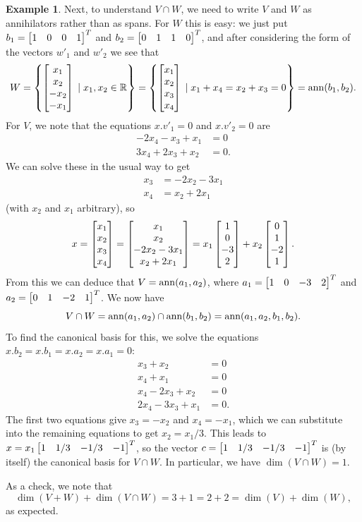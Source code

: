 \documentclass[reqno]{amsart}
\theoremstyle{definition}
\newtheorem{example}[theorem]{Example}
\begin{document}
\begin{example}
 Next, to understand $V\cap W$, we need to write $V$ and $W$ as
 annihilators rather than as spans.  For $W$ this is easy: we just put
 $b_1=\left[\begin{matrix} 1&0&0&1\end{matrix}\right]^T$ and $b_2=\left[\begin{matrix} 0&1&1&0\end{matrix}\right]^T$, and after
 considering the form of the vectors $w'_1$ and $w'_2$ we see that
 \[ W
    = \left\{\left[\begin{matrix} x_1 \\ x_2 \\ -x_2 \\ -x_1\end{matrix}\right] \;|\; x_1,x_2 \in{\mathbb{R}} \right\}
    = \left\{\left[\begin{matrix} x_1 \\ x_2 \\  x_3 \\  x_4\end{matrix}\right] \;|\; x_1+x_4=x_2+x_3=0 \right\}
    = \operatorname{ann}(b_1,b_2).
 \]
 For $V$, we note that the equations $x.v'_1=0$ and $x.v'_2=0$ are
 \begin{align*}
  -2x_4-x_3+x_1 &= 0 \\
  3x_4+2x_3+x_2 &= 0.
 \end{align*}
 We can solve these in the usual way to get
 \begin{align*}
  x_3 &= -2x_2-3x_1 \\
  x_4 &= x_2+2x_1
 \end{align*}
 (with $x_2$ and $x_1$ arbitrary), so
 \[ x
    = \left[\begin{matrix} x_1 \\ x_2 \\ x_3 \\ x_4 \end{matrix}\right]
    = \left[\begin{matrix} x_1 \\ x_2 \\ -2x_2-3x_1 \\ x_2+2x_1 \end{matrix}\right]
    = x_1 \left[\begin{matrix} 1 \\ 0 \\ -3 \\ 2 \end{matrix}\right] +
      x_2 \left[\begin{matrix} 0 \\ 1 \\ -2 \\ 1 \end{matrix}\right].
 \]
 From this we can deduce that $V=\operatorname{ann}(a_1,a_2)$, where
 $a_1=\left[\begin{matrix} 1&0&-3&2\end{matrix}\right]^T$ and $a_2=\left[\begin{matrix} 0&1&-2&1\end{matrix}\right]^T$.  We now have
 \[ V\cap W=\operatorname{ann}(a_1,a_2)\cap\operatorname{ann}(b_1,b_2)=\operatorname{ann}(a_1,a_2,b_1,b_2). \]
 To find the canonical basis for this, we solve the equations
 $x.b_2=x.b_1=x.a_2=x.a_1=0$:
 \begin{align*}
  x_3+x_2 &= 0 \\
  x_4+x_1 &= 0 \\
  x_4-2x_3+x_2 &= 0 \\
  2x_4-3x_3+x_1 &= 0.
 \end{align*}
 The first two equations give $x_3=-x_2$ and $x_4=-x_1$, which we can
 substitute into the remaining equations to get $x_2=x_1/3$.  This
 leads to $x=x_1\left[\begin{matrix} 1&1/3&-1/3&-1\end{matrix}\right]^T$, so the vector
 $c=\left[\begin{matrix} 1&1/3&-1/3&-1\end{matrix}\right]^T$ is (by itself) the canonical basis for
 $V\cap W$.  In particular, we have $\dim(V\cap W)=1$.

 As a check, we note that
 \[ \dim(V+W)+\dim(V\cap W) = 3+1 = 2+2 = \dim(V)+\dim(W), \]
 as expected.
\end{example}
\end{document}
